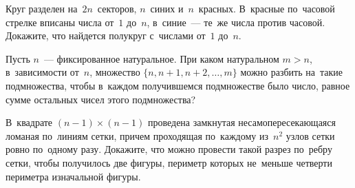 \begin{problems}
\item
Круг разделен на~$2 n$~секторов, $n$~синих и~$n$~красных.
В~красные по~часовой стрелке вписаны числа от~$1$ до~$n$, в~синие~— те~же
числа против часовой.
Докажите, что найдется полукруг с~числами от~$1$ до~$n$.

\item
Пусть $n$~— фиксированное натуральное.
При каком натуральном $m > n$, в~зависимости от~$n$, множество
$\{ n, n + 1, n + 2, \ldots, m \}$ можно разбить на~такие подмножества, чтобы
в~каждом получившемся подмножестве было число, равное сумме остальных чисел
этого подмножества?

\item
В~квадрате $(n - 1) \times (n - 1)$ проведена замкнутая несамопересекающаяся
ломаная по~линиям сетки, причем проходящая по~каждому из~$n^2$ узлов сетки
ровно по~одному разу.
Докажите, что можно провести такой разрез по~ребру сетки, чтобы получилось
две фигуры, периметр которых не~меньше четверти периметра изначальной фигуры.

\end{problems}

